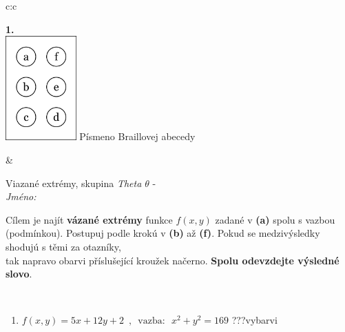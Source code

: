 \documentclass[10pt]{report}
\begin{document}
\begin{tabular}{c:c}
\begin{minipage}[c][104.5mm][t]{0.5\linewidth}
\begin{center}
\begin{minipage}{0.79\linewidth}
\begin{center}
\begin{varwidth}{\linewidth}
\begin{enumerate}
\end{enumerate}
\end{varwidth}
\end{center}
\end{minipage}
\begin{minipage}{0.20\linewidth}
\begin{center}
{\Huge\bfseries 1.} \\[2mm]
\includegraphics[height=40mm]{../images/braille.png}
{\small Písmeno Braillovej abecedy}
\end{center}
\end{minipage}
\end{center}
\end{minipage}
&
\begin{minipage}[c][104.5mm][t]{0.5\linewidth}
\begin{center}
\vspace{7mm}
{\huge Viazané extrémy, skupina \textit{Theta $\theta$} -}\\[5mm]
\textit{Jméno:}\phantom{xxxxxxxxxxxxxxxxxxxxxxxxxxxxxxxxxxxxxxxxxxxxxxxxxxxxxxxxxxxxxxxxx}\\[5mm]
\begin{minipage}{0.95\linewidth}
\begin{center}
Cílem je najít \textbf{vázané extrémy} funkce $f(x,y)$ zadané v \textbf{(a)} spolu s vazbou (podmínkou). Postupuj podle krokú v \textbf{(b)} až \textbf{(f)}. Pokud se medzivýsledky shodujú s těmi za otazníky,\\tak napravo obarvi příslušející kroužek načerno. \textbf{Spolu odevzdejte výsledné slovo}.
\end{center}
\end{minipage}
\\[1mm]
\begin{minipage}{0.79\linewidth}
\begin{center}
\begin{varwidth}{\linewidth}
\begin{enumerate}
\normalsize
\item $f(x,y)=5x+12y+2 \enspace , \enspace \mathrm{vazba:} \enspace x^2+y^2=169$\quad \dotfill\; ???\;\dotfill \quad vybarvi

\end{enumerate}
\end{varwidth}
\end{center}
\end{minipage}
\end{center}
\end{minipage}
\end{tabular}
\end{document}
